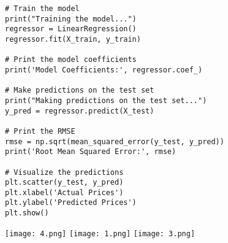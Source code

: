 \documentclass{article}
\begin{document}
\begin{verbatim}
# Train the model
print("Training the model...")
regressor = LinearRegression()
regressor.fit(X_train, y_train)

# Print the model coefficients
print('Model Coefficients:', regressor.coef_)

# Make predictions on the test set
print("Making predictions on the test set...")
y_pred = regressor.predict(X_test)

# Print the RMSE
rmse = np.sqrt(mean_squared_error(y_test, y_pred))
print('Root Mean Squared Error:', rmse)

# Visualize the predictions
plt.scatter(y_test, y_pred)
plt.xlabel('Actual Prices')
plt.ylabel('Predicted Prices')
plt.show()

\end{verbatim}
\vspace{1\baselineskip}
\texttt{[image: 4.png]}
\texttt{[image: 1.png]}
\texttt{[image: 3.png]}
\end{document}
